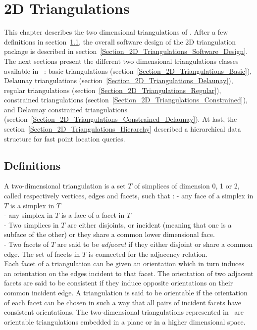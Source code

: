 \newcommand{\triangulationcomment}[1]{}

\chapter{2D Triangulations} \label{Chapter_2D_Triangulations}

This chapter describes the two dimensional triangulations
of \cgal. After a few definitions in 
section~\ref{Section_2D_Triangulations_Definitions}, 
the overall software
design of the 2D triangulation package is described 
in section~\ref{Section_2D_Triangulations_Software_Design}.
The next sections present the different two dimensional triangulations classes
available in  \cgal\ : 
basic triangulations (section~\ref{Section_2D_Triangulations_Basic}),
Delaunay triangulations
(section~\ref{Section_2D_Triangulations_Delaunay}),
regular triangulations
(section~\ref{Section_2D_Triangulations_Regular}),
constrained triangulations
(section~\ref{Section_2D_Triangulations_Constrained}),
and Delaunay constrained triangulations
(section~\ref{Section_2D_Triangulations_Constrained_Delaunay}).
At last, the section~\ref{Section_2D_Triangulations_Hierarchy}
described a hierarchical data structure for
fast point location queries.

\section{Definitions}
\label{Section_2D_Triangulations_Definitions}
A two-dimensional triangulation is a set $T$  of simplices of dimension 0,
1 or 2, called respectively vertices, edges and facets,
such that :
- any face of a simplex in $T$ is a simplex in $T$ \\
- any simplex in $T$ is a face of a facet in $T$ \\
- Two simplices in $T$ are either disjoints,
or incident (meaning that one is a subface of the other)
or they share a common lower dimensional face. \\
- Two facets of $T$ are said to be  {\em adjacent} if they
 either disjoint or share a common edge.
  The set of facets in $T$ is connected for the adjacency relation. \\

Each facet of a triangulation can be given an orientation
which in turn induces an orientation
on the edges incident to that facet. The orientation of two adjacent
facets are said to be consistent if they induce
opposite orientations on their common incident edge.
A triangulation is said to be orientable if 
the orientation of each facet can be chosen in such a way
that all pairs of incident facets have consistent orientations. 
The two-dimensional triangulations represented in \cgal\
are orientable triangulations
embedded in a plane or in a higher dimensional space.


